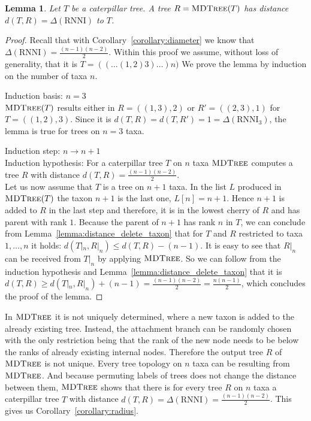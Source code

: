 \documentclass{amsart}
\newcommand{\rnni}{\mathrm{RNNI}}
\newcommand{\mdtree}{\textsc{MDTree}}
\newtheorem{lemma}[definition]{Lemma}
\begin{document}
\begin{lemma}
    Let $T$ be a caterpillar tree.
    A tree $R = \mdtree(T)$ has distance $d(T,R) = \Delta(\rnni)$ to $T$.
    \label{lemma:max_dist_caterpillar}
\end{lemma}

\begin{proof}
    Recall that with Corollary~\ref{corollary:diameter} we know that $\Delta(\rnni) = \frac{(n-1)(n-2)}{2}$.
    Within this proof we assume, without loss of generality, that it is $T = (( \dots (1,2)3)\dots)n)$
    We prove the lemma by induction on the number of taxa $n$.

    Induction basis: $n = 3$\\
    $\mdtree(T)$ results either in $R = ((1,3),2)$ or $R'= ((2,3),1)$ for $T = ((1,2),3)$.
    Since it is $d(T,R) = d(T,R') = 1 = \Delta(\rnni_3)$, the lemma is true for trees on $n=3$ taxa.

    Induction step: $n \to n+1$\\
    Induction hypothesis: For a caterpillar tree $T$ on $n$ taxa $\mdtree$ computes a tree $R$ with distance $d(T,R) = \frac{(n-1)(n-2)}{2}$.\\
    Let us now  assume that $T$ is a tree on $n+1$ taxa.
    In the list $L$ produced in $\mdtree(T)$ the taxon $n+1$ is the last one, $L[n] = n+1$.
    Hence $n+1$ is added to $R$ in the last step and therefore, it is in the lowest cherry of $R$ and has parent with rank $1$.
    Because the parent of $n+1$ has rank $n$ in $T$, we can conclude from Lemma~\ref{lemma:distance_delete_taxon} that for $T$ and $R$ restricted to taxa $1,\ldots,n$ it holds: $d(T|_n,R|_n) \leq d(T,R) - (n-1)$.
    It is easy to see that $R|_n$ can be received from $T|_n$ by applying $\mdtree$.
    So we can follow from the induction hypothesis and Lemma~\ref{lemma:distance_delete_taxon} that it is $d(T,R) \geq d(T|_n,R|_n) + (n-1) = \frac{(n-1)(n-2)}{2} = \frac{n(n-1)}{2}$, which concludes the proof of the lemma.
\end{proof}

In $\mdtree$ it is not uniquely determined, where a new taxon is added to the already existing tree.
Instead, the attachment branch can be randomly chosen with the only restriction being that the rank of the new node needs to be below the ranks of already existing internal nodes.
Therefore the output tree $R$ of $\mdtree$ is not unique.
Every tree topology on $n$ taxa can be resulting from $\mdtree$.
And because permuting labels of trees does not change the distance between them, $\mdtree$ shows that there is for every tree $R$ on $n$ taxa a caterpillar tree $T$ with distance $d(T,R) = \Delta(\rnni) = \frac{(n-1)(n-2)}{2}$.
This gives us Corollary~\ref{corollary:radius}.
\end{document}
